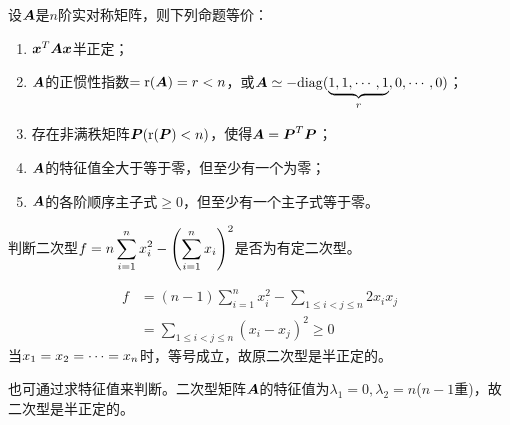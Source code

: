 \begin{frame}
  \begin{dingli}
    设$\boldsymbol{A}$是$n$阶实对称矩阵，则下列命题等价：
    \begin{enumerate}
    \item ${\boldsymbol{x}}^T\boldsymbol{A}{\boldsymbol{x}}$半正定；\\[.1in]
    \item $\boldsymbol{A}$的正惯性指数$=\mathrm{r}(\boldsymbol{A})=r<n$，或$\boldsymbol{A}\simeq -\mathrm{diag}(\underbrace{1,1,\cdots,1}_{r},0,\cdots,0)$；\\[.1in]
    \item 存在非满秩矩阵$\boldsymbol{P}(\mathrm{r}(\boldsymbol{P})<n)$，使得$\boldsymbol{A}=\boldsymbol{P}^T\boldsymbol{P}$；\\[.1in]
    \item $\boldsymbol{A}$的特征值全大于等于零，但至少有一个为零；\\[.1in]
    \item $\boldsymbol{A}$的各阶顺序主子式$\ge 0$，但至少有一个主子式等于零。
    \end{enumerate}
  \end{dingli}
\end{frame}

\begin{frame}
  \begin{li}
    判断二次型$\displaystyle f=n \sum_{i=1}^n x_i^2 - \left(\sum_{i=1}^n x_i\right)^2$是否为有定二次型。
  \end{li}
  \pause 
  \begin{jie}
    $$
    \begin{aligned}
      f&=(n-1)\sum_{i=1}^n x_i^2 - \sum_{1\le i<j \le n} 2x_ix_j\\
      &=\sum_{1\le i<j \le n}(x_i-x_j)^2\ge 0
    \end{aligned}
    $$
    当$x_1=x_2=\cdots=x_n$时，等号成立，故原二次型是半正定的。 \vspace{.1in} \pause 

    也可通过求特征值来判断。二次型矩阵$\boldsymbol{A}$的特征值为$\lambda_1=0,\lambda_2=n$($n-1$重)，故二次型是半正定的。
  \end{jie}
\end{frame}

